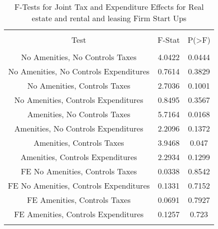 
\begin{table}[!htbp] \centering 
  \caption{F-Tests for Joint Tax and Expenditure Effects for Real estate and rental and leasing Firm Start Ups} 
  \label{53Ftests} 
\begin{tabular}{@{\extracolsep{5pt}} ccc} 
\\[-1.8ex]\hline 
\hline \\[-1.8ex] 
Test & F-Stat & P(\textgreater F) \\ 
\hline \\[-1.8ex] 
No Amenities, No Controls Taxes & 4.0422 & 0.0444 \\ 
No Amenities, No Controls Expenditures & 0.7614 & 0.3829 \\ 
No Amenities, Controls Taxes & 2.7036 & 0.1001 \\ 
No Amenities, Controls Expenditures & 0.8495 & 0.3567 \\ 
Amenities, No Controls Taxes & 5.7164 & 0.0168 \\ 
Amenities, No Controls Expenditures & 2.2096 & 0.1372 \\ 
Amenities, Controls Taxes & 3.9468 & 0.047 \\ 
Amenities, Controls Expenditures & 2.2934 & 0.1299 \\ 
FE No Amenities, Controls Taxes & 0.0338 & 0.8542 \\ 
FE No Amenities, Controls Expenditures & 0.1331 & 0.7152 \\ 
FE Amenities, Controls Taxes & 0.0691 & 0.7927 \\ 
FE Amenities, Controls Expenditures & 0.1257 & 0.723 \\ 
\hline \\[-1.8ex] 
\end{tabular} 
\end{table} 
